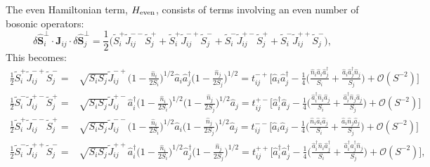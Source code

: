 \documentclass[aps, prx, nofootinbib, superscriptaddress]{revtex4-2}
\begin{document}
The even Hamiltonian term, $H_{\rm even}$, consists of terms involving an even number of bosonic operators: 
\begin{equation}
    \delta \hat{\mathbf{S}}_{i}^{\perp} \cdot \mathbf{J}_{ij} \cdot \delta \hat{\mathbf{S}}_{j}^{\perp}  
    = \frac{1}{2} \Big( \widetilde{S}_{i}^{+} \widetilde{J}_{ij}^{--} \widetilde{S}_{j}^{+}  
    + \widetilde{S}_{i}^{+} \widetilde{J}_{ij}^{-+} \widetilde{S}_{j}^{-}
    + \widetilde{S}_{i}^{-} \widetilde{J}_{ij}^{+-} \widetilde{S}_{j}^{+} 
    + \widetilde{S}_{i}^{-} \widetilde{J}_{ij}^{++} \widetilde{S}_{j}^{-} \Big),
\end{equation}
This becomes:
\begin{align*}
    \frac{1}{2} \widetilde{S}_{i}^{+} \widetilde{J}_{ij}^{-+} \widetilde{S}_{j}^{-} 
    = & 
    \sqrt{S_{i}S_{j}} \widetilde{J}_{ij}^{-+} \Big( 1 - \frac{\hat{n}_{i}}{2S_i} \Big)^{1/2} \hat{a}_{i} \hat{a}_{j}^{\dagger}  \Big( 1 - \frac{\hat{n}_{j}}{2S_j} \Big)^{1/2} 
    = t_{ij}^{-+} \Big[ \hat{a}_{i} \hat{a}_{j}^{\dagger}  - \tfrac{1}{4} \Big( \tfrac{\hat{n}_{i} \hat{a}_{i} \hat{a}_{j}^{\dagger}}{S_{i}} + \tfrac{\hat{a}_{i} \hat{a}_{j}^{\dagger} \hat{n}_{j}}{S_{j}} \Big) + \mathcal{O} (S^{-2}) \Big]
    \\
    \frac{1}{2} \widetilde{S}_{i}^{-} \widetilde{J}_{ij}^{+-} \widetilde{S}_{j}^{+} = &
    \sqrt{S_i S_j} \widetilde{J}_{ij}^{+-} \hat{a}_i^{\dagger} \Big( 1 - \frac{\hat{n}_i}{2 S_i} \Big)^{1/2} \Big( 1 - \frac{\hat{n}_j}{2 S_j} \Big)^{1/2} \hat{a}_j 
    = t_{ij}^{+-} \Big[ \hat{a}_{i}^{\dagger} \hat{a}_{j}  - \tfrac{1}{4} \Big( \tfrac{\hat{a}_{i}^{\dagger} \hat{n}_{i} \hat{a}_{j}}{S_{i}} + \tfrac{\hat{a}_{i}^{\dagger} \hat{n}_{j} \hat{a}_{j}}{S_{j}} \Big) + \mathcal{O} (S^{-2}) \Big]
    \\
    \frac{1}{2} \widetilde{S}_{i}^{+} \widetilde{J}_{ij}^{--} \widetilde{S}_{j}^{+} = & 
    \sqrt{S_i S_j} \widetilde{J}_{ij}^{--} \Big( 1 - \frac{\hat{n}_i}{2 S_i} \Big)^{1/2} \hat{a}_i \Big( 1 - \frac{\hat{n}_j}{2 S_j} \Big)^{1/2} \hat{a}_j 
    = t_{ij}^{--} \Big[ \hat{a}_{i} \hat{a}_{j} - \tfrac{1}{4} \Big( \tfrac{\hat{n}_{i} \hat{a}_{i} \hat{a}_{j}}{S_{i}} + \tfrac{\hat{a}_{i} \hat{n}_{j} \hat{a}_{j}}{S_{j}} \Big) + \mathcal{O} (S^{-2}) \Big]
    \\
    \frac{1}{2} \widetilde{S}_{i}^{-} \widetilde{J}_{ij}^{++} \widetilde{S}_{j}^{-} = & 
    \sqrt{S_i S_j} \widetilde{J}_{ij}^{++} \hat{a}_i^{\dagger} \Big( 1 - \frac{\hat{n}_i}{2 S_i} \Big)^{1/2} \hat{a}_j^{\dagger} \Big( 1 - \frac{\hat{n}_j}{2 S_j} \Big)^{1/2}
    = t_{ij}^{++} \Big[ \hat{a}_{i}^{\dagger} \hat{a}_{j}^{\dagger} - \tfrac{1}{4} \Big( \tfrac{\hat{a}_{i}^{\dagger} \hat{n}_{i} \hat{a}_{j}^{\dagger}}{S_{i}} + \tfrac{\hat{a}_{i}^{\dagger} \hat{a}_{j}^{\dagger} \hat{n}_{j}}{S_{j}} \Big) + \mathcal{O} (S^{-2}) \Big],
\end{align*}
\end{document}
